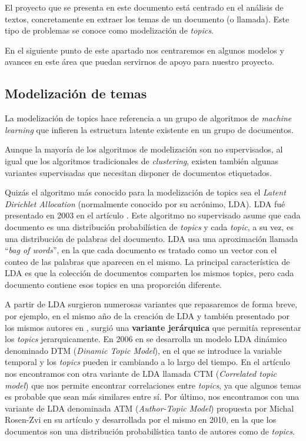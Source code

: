 El proyecto que se presenta en este documento está centrado en el análisis de textos, concretamente en extraer los temas de un documento (o llamada). Este tipo de problemas se conoce como modelización de \textit{topics}. 

En el siguiente punto de este apartado nos centraremos en algunos modelos y avances en este área que puedan servirnos de apoyo para nuestro proyecto. 


\subsection{Modelización de temas}
La modelización de topics hace referencia a un grupo de algoritmos de \textit{machine learning} que infieren la estructura latente existente en un grupo de documentos. 

Aunque la mayoría de los algoritmos de modelización son no supervisados, al igual que los algoritmos tradicionales de \textit{clustering}, existen también algunas variantes supervisadas que necesitan disponer de documentos etiquetados. 

Quizás el algoritmo más conocido para la modelización de topics sea el \textit{Latent Dirichlet Allocation} (normalmente conocido por su acrónimo, LDA). LDA fué presentado en 2003 en el artículo \cite{Blei_LDA}. Este algoritmo no supervisado asume que cada documento es una distribución probabilística de \textit{topics} y cada \textit{topic}, a su vez, es una distribución de palabras del documento. LDA usa una aproximación llamada ``\textit{bag of words}'', en la que cada documento es tratado como un vector con el conteo de las palabras que aparecen en el mismo. La principal característica de LDA es que la colección de documentos comparten los mismos topics, pero cada documento contiene esos topics en una proporción diferente. 


A partir de LDA surgieron numerosas variantes que repasaremos de forma breve, por ejemplo, en el mismo año de la creación de LDA y también presentado por los mismos autores en \cite{Blei_HTM}, surgió una \textbf{variante jerárquica} que permitía representar los \textit{topics} jerarquicamente. En 2006 en \cite{Blei_DTM} se desarrolla un modelo LDA dinámico denominado DTM (\textit{Dinamic Topic Model}), en el que se introduce la variable temporal y los \textit{topics} pueden ir cambiando a lo largo del tiempo. En el artículo \cite{Blei_CTM} nos encontramos con otra variante de LDA llamada CTM (\textit{Correlated topic model}) que nos permite encontrar correlaciones entre \textit{topics}, ya que algunos temas es probable que sean más similares entre sí. Por último, nos encontramos con una variante de LDA denominada ATM (\textit{Author-Topic Model}) propuesta  por	Michal Rosen-Zvi en su artículo \cite{Rosen-Zvi_AMA_2010}  y desarrollada por el mismo en 2010, en la que los documentos son una distribución probabilística tanto de autores como de \textit{topics}.    


